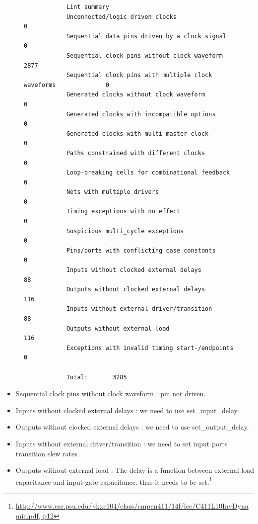 \documentclass[11pt,a4paper,sans,dvipsnames]{report}
\begin{document}
	\begin{figure}[h!]
		\centering
		\begin{lstlisting}
			Lint summary
			Unconnected/logic driven clocks                                  0
			Sequential data pins driven by a clock signal                    0
			Sequential clock pins without clock waveform                  2877
			Sequential clock pins with multiple clock waveforms              0
			Generated clocks without clock waveform                          0
			Generated clocks with incompatible options                       0
			Generated clocks with multi-master clock                         0
			Paths constrained with different clocks                          0
			Loop-breaking cells for combinational feedback                   0
			Nets with multiple drivers                                       0
			Timing exceptions with no effect                                 0
			Suspicious multi_cycle exceptions                                0
			Pins/ports with conflicting case constants                       0
			Inputs without clocked external delays                          88
			Outputs without clocked external delays                        116
			Inputs without external driver/transition                       88
			Outputs without external load                                  116
			Exceptions with invalid timing start-/endpoints                  0

			Total:       3285
		\end{lstlisting}
		\label{fig:report_lint}
	\end{figure}

	\begin{itemize}
		\item Sequential clock pins without clock waveform : pin not driven.
		\item Inputs without clocked external delays :  we need to use set\_input\_delay.
		\item Outputs without clocked external delays : we need to use set\_output\_delay.
		\item Inputs without external driver/transition : we need to set input ports transition slew rates.
		\item Outputs without external load : The delay is  a function between external load capacitance and input gate capacitance. thus it needs to be set.\footnote{\url{http://www.cse.psu.edu/~kxc104/class/cmpen411/14f/lec/C411L10InvDynamic.pdf, p12}}
	\end{itemize}
\end{document}

